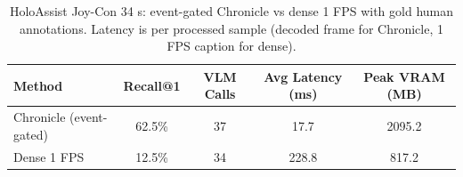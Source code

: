 \begin{table}[t]
  \centering
  \caption{HoloAssist Joy-Con 34 s: event-gated Chronicle vs dense 1 FPS with gold human annotations. Latency is per processed sample (decoded frame for Chronicle, 1 FPS caption for dense).}
  \label{tab:chronicle-vs-dense-holo}
  \begin{tabular}{lcccc}
    \toprule
    Method & Recall@1 & VLM Calls & Avg Latency (ms) & Peak VRAM (MB) \\
    \midrule
    Chronicle (event-gated) & 62.5\% & 37 & 17.7 & 2095.2 \\
    Dense 1 FPS & 12.5\% & 34 & 228.8 & 817.2 \\
    \bottomrule
  \end{tabular}
\end{table}
